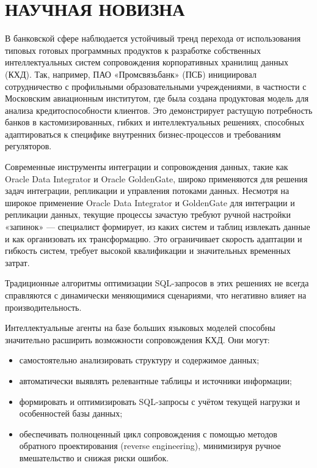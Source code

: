 \section{НАУЧНАЯ НОВИЗНА}

В банковской сфере наблюдается устойчивый тренд перехода от использования типовых готовых программных продуктов к разработке собственных интеллектуальных систем сопровождения корпоративных хранилищ данных (КХД). Так, например, ПАО «Промсвязьбанк» (ПСБ) инициировал сотрудничество с профильными образовательными учреждениями, в частности с Московским авиационным институтом, где была создана продуктовая модель для анализа кредитоспособности клиентов. Это демонстрирует растущую потребность банков в кастомизированных, гибких и интеллектуальных решениях, способных адаптироваться к специфике внутренних бизнес-процессов и требованиям регуляторов.

Современные инструменты интеграции и сопровождения данных, такие как Oracle Data Integrator и Oracle GoldenGate, широко применяются для решения задач интеграции, репликации и управления потоками данных. Несмотря на широкое применение Oracle Data Integrator и GoldenGate для интеграции и репликации данных, текущие процессы зачастую требуют ручной настройки «запинок» — специалист формирует, из каких систем и таблиц извлекать данные и как организовать их трансформацию. Это ограничивает скорость адаптации и гибкость систем, требует высокой квалификации и значительных временных затрат.

Традиционные алгоритмы оптимизации SQL-запросов в этих решениях не всегда справляются с динамически меняющимися сценариями, что негативно влияет на производительность.

Интеллектуальные агенты на базе больших языковых моделей способны значительно расширить возможности сопровождения КХД. Они могут:
\begin{itemize}
    \item самостоятельно анализировать структуру и содержимое данных;
    \item автоматически выявлять релевантные таблицы и источники информации;
    \item формировать и оптимизировать SQL-запросы с учётом текущей нагрузки и особенностей базы данных;
    \item обеспечивать полноценный цикл сопровождения с помощью методов обратного проектирования (reverse engineering), минимизируя ручное вмешательство и снижая риски ошибок.
\end{itemize}


